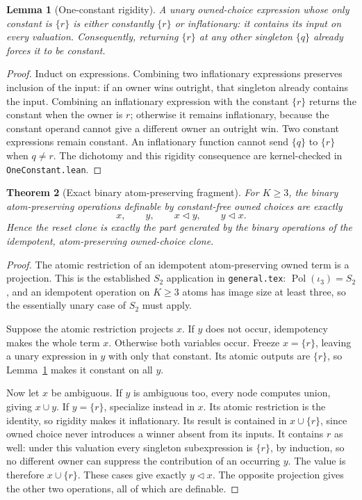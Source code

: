 \documentclass[11pt]{article}
\newtheorem{theorem}{Theorem}[section]
\newtheorem{lemma}[theorem]{Lemma}
\newcommand{\del}{\mathbin{\triangleleft}}
\begin{document}
\begin{lemma}[One-constant rigidity]\label{lem:rigidity}
A unary owned-choice expression whose only constant is $\{r\}$ is
either constantly $\{r\}$ or inflationary: it contains its input on
every valuation. Consequently, returning $\{r\}$ at any other singleton
$\{q\}$ already forces it to be constant.
\end{lemma}
\begin{proof}
Induct on expressions. Combining two inflationary expressions preserves
inclusion of the input: if an owner wins outright, that singleton
already contains the input. Combining an inflationary expression with
the constant $\{r\}$ returns the constant when the owner is $r$;
otherwise it remains inflationary, because the constant operand cannot
give a different owner an outright win. Two constant expressions remain
constant. An inflationary function cannot send $\{q\}$ to $\{r\}$ when
$q\ne r$. The dichotomy and this rigidity consequence are
kernel-checked in \texttt{OneConstant.lean}.
\end{proof}

\begin{theorem}[Exact binary atom-preserving fragment]\label{thm:binary}
For $K\geq3$, the binary atom-preserving operations definable by
constant-free owned choices are exactly
\[
 x,\qquad y,\qquad x\del y,\qquad y\del x.
\]
Hence the reset clone is exactly the part generated by the binary
operations of the idempotent, atom-preserving owned-choice clone.
\end{theorem}
\begin{proof}
The atomic restriction of an idempotent atom-preserving owned term is
a projection. This is the established $S_2$ application in
\texttt{general.tex}: $\operatorname{Pol}(\iota_3)=S_2$
\cite[Proposition~2.2]{Szendrei2012}, and an idempotent operation on
$K\geq3$ atoms has image size at least three, so the essentially unary
case of $S_2$ must apply.

Suppose the atomic restriction projects $x$. If $y$ does not occur,
idempotency makes the whole term $x$. Otherwise both variables occur.
Freeze $x=\{r\}$, leaving a unary expression in $y$ with only that
constant. Its atomic outputs are $\{r\}$, so
Lemma~\ref{lem:rigidity} makes it constant on all $y$.

Now let $x$ be ambiguous. If $y$ is ambiguous too, every node computes
union, giving $x\cup y$. If $y=\{r\}$, specialize instead in $x$.
Its atomic restriction is the identity, so rigidity makes it
inflationary. Its result is contained in $x\cup\{r\}$, since owned
choice never introduces a winner absent from its inputs. It contains
$r$ as well: under this valuation every singleton subexpression is
$\{r\}$, by induction, so no different owner can suppress the
contribution of an occurring $y$. The value is therefore
$x\cup\{r\}$. These cases give exactly $y\del x$.
The opposite projection gives the other two operations, all of which
are definable.
\end{proof}
\end{document}
